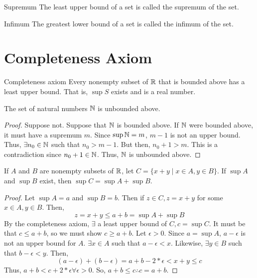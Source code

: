 \begin{definition}{Supremum}{}
    The least upper bound of a set is called the supremum of the set.
\end{definition}
\begin{definition}{Infimum}{}
    The greatest lower bound of a set is called the infimum of the set.
\end{definition}

\section{Completeness Axiom}
\begin{definition}{Completeness axiom}{}
    Every nonempty subset of $\mathbb{R}$ that is bounded above has a least upper bound. That is, $\sup S$ exists and is a real number.
\end{definition}

\begin{theorem}{}{}
    The set of natural numbers $\mathbb{N}$ is unbounded above.
\end{theorem}
\begin{proof}
    Suppose not. Suppose that $\mathbb{N}$ is bounded above. If $\mathbb{N}$ were bounded above, it must have a supremum $m$. Since $\sup \mathbb{N} = m$, $m - 1$ is not an upper bound. Thus, $\exists n_0 \in \mathbb{N}$ such that $n_0 > m - 1$. But then, $n_0 + 1 > m$. This is a contradiction since $n_0 + 1 \in \mathbb{N}$. Thus, $\mathbb{N}$ is unbounded above.
\end{proof}

\begin{theorem}{}{}
    If $A$ and $B$ are nonempty subsets of $\mathbb{R}$, let $C = \{x + y \mid x \in A, y \in B\}$. If $\sup A$ and $\sup B$ exist, then $\sup C = \sup A + \sup B$.
\end{theorem}
\begin{proof}
    Let $\sup A = a$ and $\sup B = b$. Then if $z \in C, z = x + y$ for some $x \in A, y \in B$. Then,
    $$ z = x + y \leq a + b = \sup A + \sup B $$
    By the completeness axiom, $\exists$ a least upper bound of $C, c = \sup C$. It must be that $c \leq a + b$, so we must show $c \geq a + b$. Let $\epsilon > 0$. Since $a = \sup A$, $a - \epsilon$ is not an upper bound for $A$. $\exists x \in A$ such that $a - \epsilon < x$. Likewise, $\exists y \in B$ such that $b - \epsilon < y$. Then,
    $$ (a - \epsilon) + (b - \epsilon) = a + b - 2 * \epsilon < x + y \leq c $$
    Thus, $a + b < c + 2 * \epsilon \forall \epsilon > 0$. So, $a + b \leq c \therefore c = a + b$.
\end{proof}